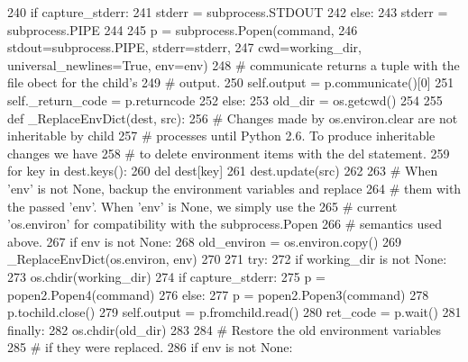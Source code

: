\begin{DoxyCode}
240       \textcolor{keywordflow}{if} capture\_stderr:
241         stderr = subprocess.STDOUT
242       \textcolor{keywordflow}{else}:
243         stderr = subprocess.PIPE
244 
245       p = subprocess.Popen(command,
246                            stdout=subprocess.PIPE, stderr=stderr,
247                            cwd=working\_dir, universal\_newlines=\textcolor{keyword}{True}, env=env)
248       \textcolor{comment}{# communicate returns a tuple with the file obect for the child's}
249       \textcolor{comment}{# output.}
250       self.output = p.communicate()[0]
251       self.\_return\_code = p.returncode
252     \textcolor{keywordflow}{else}:
253       old\_dir = os.getcwd()
254 
255       \textcolor{keyword}{def }\_ReplaceEnvDict(dest, src):
256         \textcolor{comment}{# Changes made by os.environ.clear are not inheritable by child}
257         \textcolor{comment}{# processes until Python 2.6. To produce inheritable changes we have}
258         \textcolor{comment}{# to delete environment items with the del statement.}
259         \textcolor{keywordflow}{for} key \textcolor{keywordflow}{in} dest.keys():
260           del dest[key]
261         dest.update(src)
262 
263       \textcolor{comment}{# When 'env' is not None, backup the environment variables and replace}
264       \textcolor{comment}{# them with the passed 'env'. When 'env' is None, we simply use the}
265       \textcolor{comment}{# current 'os.environ' for compatibility with the subprocess.Popen}
266       \textcolor{comment}{# semantics used above.}
267       \textcolor{keywordflow}{if} env \textcolor{keywordflow}{is} \textcolor{keywordflow}{not} \textcolor{keywordtype}{None}:
268         old\_environ = os.environ.copy()
269         \_ReplaceEnvDict(os.environ, env)
270 
271       \textcolor{keywordflow}{try}:
272         \textcolor{keywordflow}{if} working\_dir \textcolor{keywordflow}{is} \textcolor{keywordflow}{not} \textcolor{keywordtype}{None}:
273           os.chdir(working\_dir)
274         \textcolor{keywordflow}{if} capture\_stderr:
275           p = popen2.Popen4(command)
276         \textcolor{keywordflow}{else}:
277           p = popen2.Popen3(command)
278         p.tochild.close()
279         self.output = p.fromchild.read()
280         ret\_code = p.wait()
281       \textcolor{keywordflow}{finally}:
282         os.chdir(old\_dir)
283 
284         \textcolor{comment}{# Restore the old environment variables}
285         \textcolor{comment}{# if they were replaced.}
286         \textcolor{keywordflow}{if} env \textcolor{keywordflow}{is} \textcolor{keywordflow}{not} \textcolor{keywordtype}{None}:

\end{DoxyCode}
